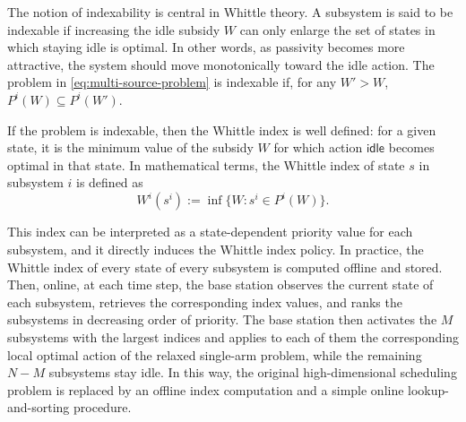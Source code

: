 \documentclass[letterpaper,journal]{IEEEtran}
\begin{document}
The notion of indexability is central in Whittle theory. A subsystem is said to be indexable if increasing the idle subsidy $W$ can only enlarge the set of states in which staying idle is optimal. In other words, as passivity becomes more attractive, the system should move monotonically toward the idle action. The problem in \eqref{eq:multi-source-problem} is indexable if, for any $W'>W$, $P^i(W)\subseteq P^i(W')$.

If the problem is indexable, then the Whittle index is well defined: for a given state, it is the minimum value of the subsidy $W$ for which action $\mathsf{idle}$ becomes optimal in that state. In mathematical terms, the Whittle index of state $s$ in subsystem $i$ is defined as
\begin{equation}\label{eq:whittle-index}
W^i(s^i):=\inf\{W:s^i\in P^i(W)\}.
\end{equation}

This index can be interpreted as a state-dependent priority value for each subsystem, and it directly induces the Whittle index policy. In practice, the Whittle index of every state of every subsystem is computed offline and stored. Then, online, at each time step, the base station observes the current state of each subsystem, retrieves the corresponding index values, and ranks the subsystems in decreasing order of priority. The base station then activates the $M$ subsystems with the largest indices and applies to each of them the corresponding local optimal action of the relaxed single-arm problem, while the remaining $N-M$ subsystems stay idle. In this way, the original high-dimensional scheduling problem is replaced by an offline index computation and a simple online lookup-and-sorting procedure.
\end{document}
